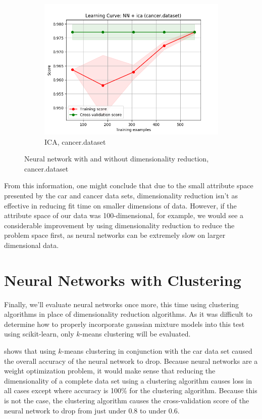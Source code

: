 \documentclass{article}
\begin{document}
\begin{figure}[htb]
\begin{subfigure}{0.33\textwidth}
        \includegraphics[width=\linewidth]{out/nn_dr/cancer-ica-learning.png}
        \caption{ICA, cancer.dataset}
      \end{subfigure}

    \caption{Neural network with and without dimensionality reduction, cancer.dataset}
    \label{fig:nndr-plot-cancer}
    \end{figure}

    From this information, one might conclude that due to the small attribute space presented by the car and cancer data sets, dimensionality reduction isn't as effective in reducing fit time on smaller dimensions of data. However, if the attribute space of our data was 100-dimensional, for example, we would see a considerable improvement by using dimensionality reduction to reduce the problem space first, as neural networks can be extremely slow on larger dimensional data.

  \section{Neural Networks with Clustering}
    Finally, we'll evaluate neural networks once more, this time using clustering algorithms in place of dimensionality reduction algorithms. As it was difficult to determine how to properly incorporate gaussian mixture models into this test using scikit-learn, only $k$-means clustering will be evaluated.

     shows that using $k$-means clustering in conjunction with the car data set caused the overall accuracy of the neural network to drop. Because neural networks are a weight optimization problem, it would make sense that reducing the dimensionality of a complete data set using a clustering algorithm causes loss in all cases except where accuracy is 100\% for the clustering algorithm. Because this is not the case, the clustering algorithm causes the cross-validation score of the neural network to drop from just under 0.8 to under 0.6.
\end{document}
